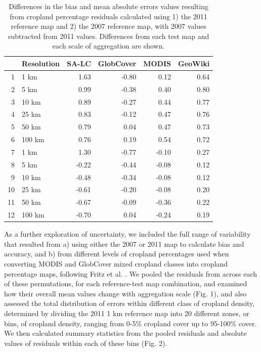 \documentclass[11pt, titlepage]{article}
\begin{document}
\begin{table}[!ht]
\caption{Differences in the bias and mean absolute errors values resulting from cropland percentage residuals calculated using 1) the 2011 reference map and 2) the 2007 reference map, with 2007 values subtracted from 2011 values. Differences from each test map and each scale of aggregation are shown. }
\centering
\begin{tabular}{rlrrrr}
  \hline
 & Resolution & SA-LC & GlobCover & MODIS & GeoWiki \\ 
  \hline
1 & 1 km & 1.63 & -0.80 & 0.12 & 0.64 \\ 
  2 & 5 km & 0.99 & -0.38 & 0.40 & 0.80 \\ 
  3 & 10 km & 0.89 & -0.27 & 0.44 & 0.77 \\ 
  4 & 25 km & 0.83 & -0.12 & 0.47 & 0.76 \\ 
  5 & 50 km & 0.79 & 0.04 & 0.47 & 0.73 \\ 
  6 & 100 km & 0.76 & 0.19 & 0.54 & 0.72 \\ 
  7 & 1 km & 1.30 & -0.77 & -0.10 & 0.27 \\ 
  8 & 5 km & -0.22 & -0.44 & -0.08 & 0.12 \\ 
  9 & 10 km & -0.48 & -0.34 & -0.08 & 0.12 \\ 
  10 & 25 km & -0.61 & -0.20 & -0.08 & 0.20 \\ 
  11 & 50 km & -0.67 & -0.09 & -0.36 & 0.22 \\ 
  12 & 100 km & -0.70 & 0.04 & -0.24 & 0.19 \\ 
   \hline
\end{tabular}
\end{table}

As a further exploration of uncertainty, we included the full range of variability that resulted from a) using either the 2007 or 2011 map to calculate bias and accuracy, and b) from different levels of cropland percentages used when converting MODIS and GlobCover mixed cropland classes into cropland percentage maps, following Fritz et al. \cite{fritz_mapping_2015}. We pooled the residuals from across each of these permutations, for each reference-test map combination, and examined how their overall mean values change with aggregation scale (Fig. 1), and also assessed the total distribution of errors within different class of cropland density, determined by dividing the 2011 1 km reference map into 20 different zones, or bins, of cropland density, ranging from 0-5\% cropland cover up to 95-100\% cover. We then calculated summary statistics from the pooled residuals and absolute values of residuals within each of these bins (Fig. 2).   
\end{document}
